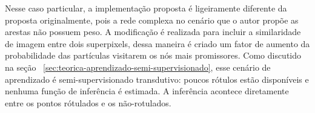 Nesse caso particular, a implementação proposta é ligeiramente
diferente da proposta originalmente, pois a rede complexa no cenário
que o autor propõe as arestas não possuem peso. A modificação é
realizada para incluir a similaridade de imagem entre dois
superpixels, dessa maneira é criado um fator de aumento da
probabilidade das partículas visitarem os nós mais promissores. Como
discutido na seção
~\ref{sec:teorica-aprendizado-semi-supervisionado}, esse cenário de
aprendizado é semi-supervisionado transdutivo: poucos rótulos estão
disponíveis e nenhuma função de inferência é estimada. A inferência
acontece diretamente entre os pontos rótulados e os não-rotulados.


\begin{figure}[!h]
        \captionsetup{width=12cm}
		\centering
\end{figure}
\FloatBarrier{}

